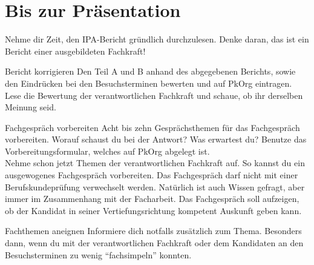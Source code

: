 \chapter{Bis zur Präsentation}
Nehme dir Zeit, den IPA-Bericht gründlich durchzulesen. Denke daran, das ist ein Bericht einer ausgebildeten Fachkraft!

\begin{taskitemwithoutcomment}{Bericht korrigieren}
  Den Teil A und B anhand des abgegebenen Berichts, sowie den Eindrücken bei den Besuchsterminen bewerten und auf PkOrg eintragen. Lese die Bewertung der verantwortlichen Fachkraft und schaue, ob ihr derselben Meinung seid.
\end{taskitemwithoutcomment}
\begin{taskitemwithoutcomment}{Fachgespräch vorbereiten}
  Acht bis zehn Gesprächsthemen für das Fachgespräch vorbereiten. Worauf schaust du bei der Antwort? Was erwartest du? Benutze das Vorbereitungsformular, welches auf PkOrg abgelegt ist.\\ Nehme schon jetzt Themen der verantwortlichen Fachkraft auf. So kannst du ein ausgewogenes Fachgespräch vorbereiten. Das Fachgespräch darf nicht mit einer Berufskundeprüfung verwechselt werden. Natürlich ist auch Wissen gefragt, aber immer im Zusammenhang mit der Facharbeit. Das Fachgespräch soll aufzeigen, ob der Kandidat in seiner Vertiefungsrichtung kompetent Auskunft geben kann.
\end{taskitemwithoutcomment}
\begin{taskitem}{Fachthemen aneignen}
  Informiere dich notfalls zusätzlich zum Thema. Besonders dann, wenn du mit der verantwortlichen Fachkraft oder dem Kandidaten an den Besuchsterminen zu wenig \enquote{fachsimpeln} konnten.
\end{taskitem}
